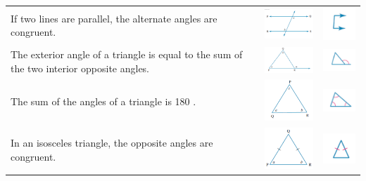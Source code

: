 \documentclass[a4paper,10pt]{report}
\begin{document}
\begin{center}
\begin{tabular}{|p{5cm}|p{3cm}|p{2cm}|}
		If two lines are parallel, the alternate angles are congruent.                            & \includegraphics[width=3cm]{geometry theorem 4}  & \includegraphics[width=2cm]{geometry theorem 4 symbol}  \\
		The exterior angle of a triangle is equal to the sum of the two interior opposite angles. & \includegraphics[width=3cm]{geometry theorem 5}  & \includegraphics[width=2cm]{geometry theorem 5 symbol}  \\
		The sum of the angles of a triangle is 180 \degree.                                       & \includegraphics[width=3cm]{geometry theorem 6}  & \includegraphics[width=2cm]{geometry theorem 6 symbol}  \\
		In an isosceles triangle, the opposite angles are congruent.                              & \includegraphics[width=3cm]{geometry theorem 7}  & \includegraphics[width=2cm]{geometry theorem 7 symbol}  \\

\end{tabular}
\end{center}
\end{document}
